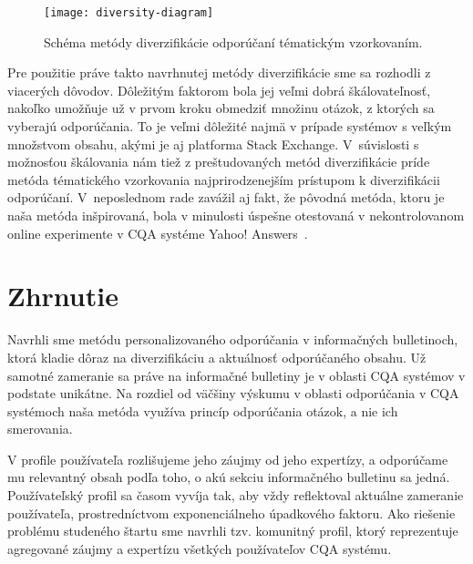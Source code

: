 \begin{figure}[H]\begin{center}
\texttt{[image: diversity-diagram]}
\caption{Schéma metódy diverzifikácie odporúčaní tématickým vzorkovaním.\label{fig:tematic-sampling}}\end{center}
\end{figure}

Pre použitie práve takto navrhnutej metódy diverzifikácie sme sa rozhodli z viacerých dôvodov. Dôležitým faktorom bola
jej veľmi dobrá škálovateľnosť, nakoľko umožňuje už v prvom kroku obmedziť množinu otázok, z ktorých sa vyberajú odporúčania.
To je veľmi dôležité najmä v prípade systémov s veľkým množstvom obsahu, akými je aj platforma Stack Exchange.
V~súvislosti s možnosťou škálovania nám tiež z preštudovaných metód diverzifikácie príde metóda tématického vzorkovania
najprirodzenejším prístupom k diverzifikácii odporúčaní. V~neposlednom rade zavážil aj fakt, že pôvodná metóda,
ktoru je naša metóda inšpirovaná, bola v minulosti úspešne otestovaná v nekontrolovanom online experimente
v CQA systéme Yahoo! Answers~\cite{Szpektor2013}.

\section{Zhrnutie}

Navrhli sme metódu personalizovaného odporúčania v informačných bulletinoch, ktorá kladie dôraz na diverzifikáciu
a aktuálnosť odporúčaného obsahu. Už samotné zameranie sa práve na informačné bulletiny je v oblasti CQA systémov
v podstate unikátne. Na rozdiel od väčšiny výskumu v oblasti odporúčania v CQA systémoch naša metóda využíva
princíp odporúčania otázok, a nie ich smerovania.

V profile používateľa rozlišujeme jeho záujmy od jeho expertízy,
a odporúčame mu relevantný obsah podľa toho, o akú sekciu informačného bulletinu sa jedná.
Používateľský profil sa časom vyvíja tak, aby vždy reflektoval aktuálne zameranie používateľa, prostredníctvom
exponenciálneho úpadkového faktoru. Ako riešenie problému studeného štartu sme navrhli tzv. komunitný profil,
ktorý reprezentuje agregované záujmy a expertízu všetkých používateľov CQA systému.
